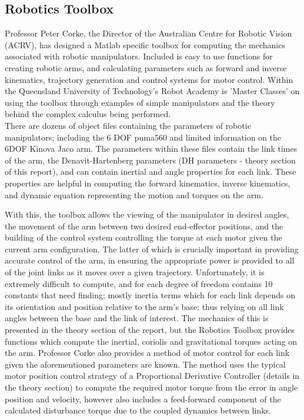 \documentclass[12pt,openany,a4paper]{book}
\begin{document}
\subsection{Robotics Toolbox}
Professor Peter Corke, the Director of the Australian Centre for Robotic Vision (ACRV), has designed a Matlab specific toolbox for computing the mechanics associated with robotic manipulators. Included is easy to use functions for creating robotic arms, and calculating parameters such as forward and inverse kinematics, trajectory generation and control systems for motor control. Within the Queensland University of Technology's Robot Academy is 'Master Classes' on using the toolbox through examples of simple manipulators and the theory behind the complex calculus being performed.\\

There are dozens of object files containing the parameters of robotic manipulators; including the 6 DOF puma560 and limited information on the 6DOF Kinova Jaco arm. The parameters within these files contain the link times of the arm, the Denavit-Hartenberg parameters (DH parameters - theory section of this report), and can contain inertial and angle properties for each link. These properties are helpful in computing the forward kinematics, inverse kinematics, and dynamic equation representing the motion and torques on the arm.

With this, the toolbox allows the viewing of the manipulator in desired angles, the movement of the arm between two desired end-effector positions, and the building of the control system controlling the torque at each motor given the current arm configuration. The latter of which is crucially important in providing accurate control of the arm, in ensuring the appropriate power is provided to all of the joint links as it moves over a given trajectory. Unfortunately, it is extremely difficult to compute, and for each degree of freedom contains 10 constants that need finding; mostly inertia terms which for each link depends on its orientation and position relative to the arm's base; thus relying on all link angles between the base and the link of interest. The mechanics of this is presented in the theory section of the report, but the Robotics Toolbox provides functions which compute the inertial, coriolis and gravitational torques acting on the arm. Professor Corke also provides a method of motor control for each link given the aforementioned parameters are known. The method uses the typical motor position control strategy of a Proportional Derivative Controller (details in the theory section) to compute the required motor torque from the error in angle position and velocity, however also includes a feed-forward component of the calculated disturbance torque due to the coupled dynamics between links. 
\end{document}
